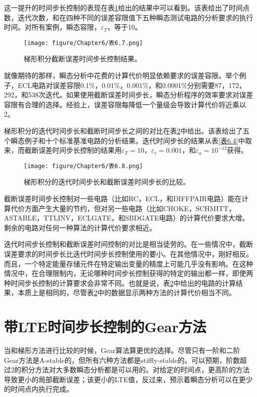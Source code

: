 这一提升的时间步长控制的表现在表\ref{表6.7}给出的结果中可以看到。该表给出了时间点数，迭代次数，和在四种不同的误差容限值下五种瞬态测试电路的分析要求的执行时间。对所有案例，瞬态容限，$\varepsilon_T$，等于10。

\begin{figure}[htbp]
\small
    \centering
    \texttt{[image: figure/Chapter6/表6.7.png]}
    \caption{梯形积分截断误差时间步长控制结果。}
    \label{表6.7}
\end{figure}

就像期待的那样，瞬态分析中花费的计算代价明显依赖要求的误差容限。举个例子，ECL电路对误差容限0.1\%，0.01\%，0.001\%，和0.0001\%分别需要87，172，292，和538次迭代。如果使用截断误差时间步长，瞬态分析程序的效率要求对误差容限有合理的选择。经验上，误差容限每降低一个量级会导致计算代价将近乘以2。

梯形积分的迭代时间步长和截断时间步长之间的对比在表\ref{表6.8}中给出。该表给出了五个瞬态例子和十个标准基准电路的分析结果。迭代时间步长的结果从表\ref{表6.4}中取来，而截断误差时间步长控制的结果用$\varepsilon_T = 10$，$\varepsilon_r = 0.001$，和$\varepsilon_a = 10^{-12}$获得。

\begin{figure}[htbp]
\small
    \centering
    \texttt{[image: figure/Chapter6/表6.8.png]}
    \caption{梯形积分的迭代时间步长和截断误差时间步长的比较。}
    \label{表6.8}
\end{figure}

截断误差时间步长控制对一些电路（比如RC，ECL，和DIFFPAIR电路）能在计算代价方面产生大量的节约，但对另一些电路（比如CHOKE，SCHMITT，ASTABLE，TTLINV，ECLGATE，和SBDGATE电路）的计算代价要求大增。剩余的电路对任何一种算法的计算代价要求相近。

迭代时间步长控制和截断误差时间控制的对比是相当徒劳的。在一些情况中，截断误差要求的时间步长比迭代时间步长控制使用的要小。在其他情况中，刚好相反。而且，一个特定能量存储元件在特定输出变量的精度上可能几乎没有影响。在这种情况中，在合理限制内，无论哪种时间步长控制获得的特定的输出都一样，即使两种时间步长控制的计算要求会非常不同。也就是说，表\ref{表6.8}中给出的电路的计算结果，本质上是相同的，尽管表\ref{表6.8}中的数据显示两种方法的计算代价相当不同。

\section{带LTE时间步长控制的Gear方法}
当和梯形方法进行比较的时候，Gear算法算更优的选择。尽管只有一阶和二阶Gear方法是A-stable的，但所有六种方法都是stiffly-stable的。可以预期，阶数超过2的积分方法对大多数瞬态分析都是可以用的。对给定的时间点，更高阶的方法导致更小的局部截断误差；该更小的LTE值，反过来，预示着瞬态分析可以在更少的时间点内执行完成。

